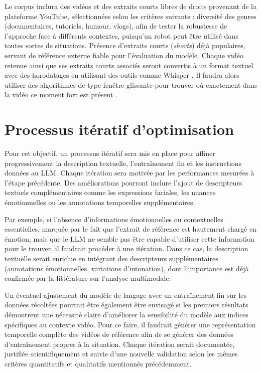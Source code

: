 \documentclass[livre]{udes-genie-these}
\begin{document}
Le corpus inclura des vidéos et des extraits courts libres de droits provenant de la plateforme YouTube, sélectionnées selon les critères suivants : diversité des genres (documentaires, tutoriels, humour, vlogs), afin de tester la robustesse de l'approche face à différents contextes, puisqu'un robot peut être utilisé dans toutes sortes de situations. Présence d'extraits courts (\textit{shorts}) déjà populaires, servant de référence externe fiable pour l'évaluation du modèle. Chaque vidéo retenue ainsi que ses extraits courts associés seront convertis à un format textuel avec des horodatages en utilisant des outils comme Whisper \cite{radford2023_whisper}. Il faudra alors utiliser des algorithmes de type fenêtre glissante pour trouver où exactement dans la vidéo ce moment fort est présent \cite{chae2024_benchmark}.

\section{Processus itératif d'optimisation}

Pour cet objectif, un processus itératif sera mis en place pour affiner progressivement la description textuelle, l'entraînement fin et les instructions données au LLM. Chaque itération sera motivée par les performances mesurées à l'étape précédente. Des améliorations pourront inclure l'ajout de descripteurs textuels complémentaires comme les expressions faciales, les nuances émotionnelles ou les annotations temporelles supplémentaires. 

Par exemple, si l'absence d'informations émotionnelles ou contextuelles essentielles, marquée par le fait que l'extrait de référence est hautement chargé en émotion, mais que le LLM ne semble pas être capable d'utiliser cette information pour le trouver, il faudrait procéder à une itération. Dans ce cas, la description textuelle serait enrichie en intégrant des descripteurs supplémentaires (annotations émotionnelles, variations d'intonation), dont l'importance est déjà confirmée par la littérature sur l'analyse multimodale. 

Un éventuel ajustement du modèle de langage avec un entraînement fin sur les données récoltées pourrait être également être envisagé si les premiers résultats démontrent une nécessité claire d'améliorer la sensibilité du modèle aux indices spécifiques au contexte vidéo. Pour ce faire, il faudrait générer une représentation temporelle complète des vidéos de référence afin de se générer des données d'entraînement propres à la situation. Chaque itération serait documentée, justifiée scientifiquement et suivie d'une nouvelle validation selon les mêmes critères quantitatifs et qualitatifs mentionnés précédemment.
\end{document}
